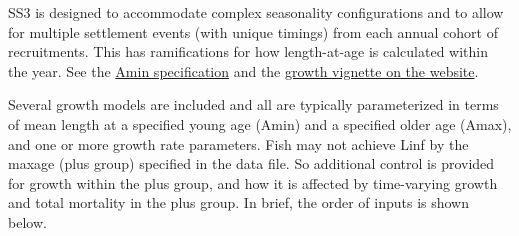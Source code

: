 SS3 is designed to accommodate complex seasonality configurations and to allow for multiple settlement events (with unique timings) from each annual cohort of recruitments. This has ramifications for how length-at-age is calculated within the year. See the \hyperlink{Amin}{Amin specification} and the \href{https://nmfs-ost.github.io/ss3-website/qmds/growth_seasonality.html}{growth vignette on the website}.  

Several growth models are included and all are typically parameterized in terms of mean length at a specified young age (Amin) and a specified older age (Amax), and one or more growth rate parameters. Fish may not achieve Linf by the maxage (plus group) specified in the data file. So additional control is provided for growth within the plus group, and how it is affected by time-varying growth and total mortality in the plus group. In brief, the order of inputs is shown below.

\hypertarget{GrowthInputs}{}

